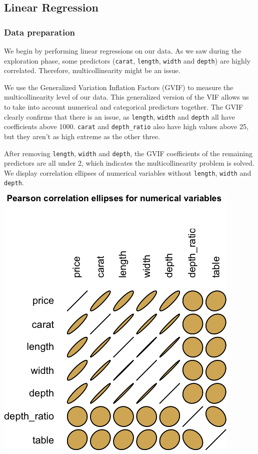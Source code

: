 \documentclass[
  paper=a4,
  ,captions=tableheading
]{scrartcl}
\begin{document}
\hypertarget{linear-regression}{%
\subsection{Linear Regression}\label{linear-regression}}

\hypertarget{data-preparation}{%
\subsubsection{Data preparation}\label{data-preparation}}

We begin by performing linear regressions on our data. As we saw during
the exploration phase, some predictors (\texttt{carat}, \texttt{length},
\texttt{width} and \texttt{depth}) are highly correlated. Therefore,
multicollinearity might be an issue.

We use the Generalized Variation Inflation Factors (GVIF) to measure the
multicollinearity level of our data. This generalized version of the VIF
allows us to take into account numerical and categorical predictors
together. The GVIF clearly confirms that there is an issue, as
\texttt{length}, \texttt{width} and \texttt{depth} all have coefficients
above 1000. \texttt{carat} and \texttt{depth\_ratio} also have high
values above 25, but they aren't as high extreme as the other three.

After removing \texttt{length}, \texttt{width} and \texttt{depth}, the
GVIF coefficients of the remaining predictors are all under 2, which
indicates the multicollinearity problem is solved. We display
correlation ellipses of numerical variables without \texttt{length},
\texttt{width} and \texttt{depth}.

\begin{center}\includegraphics{Diamonds_PDF_files/figure-latex/uncorrelated-ellipses-1} \end{center}
\end{document}
